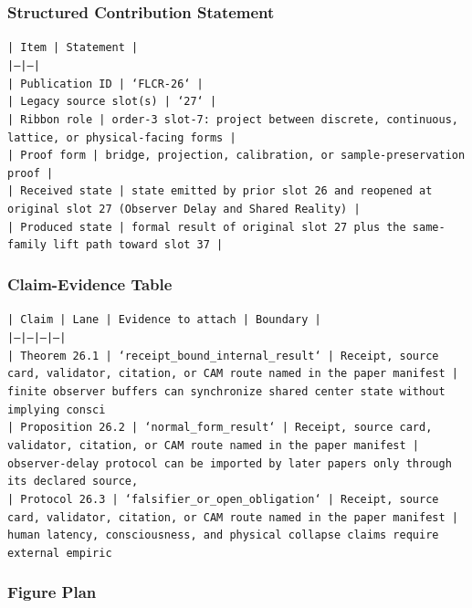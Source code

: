 \documentclass[11pt]{article}
\begin{document}
\subsubsection*{Structured Contribution Statement}

\noindent\texttt{| Item | Statement |}\\
\noindent\texttt{|---|---|}\\
\noindent\texttt{| Publication ID | `FLCR-26` |}\\
\noindent\texttt{| Legacy source slot(s) | `27` |}\\
\noindent\texttt{| Ribbon role | order-3 slot-7: project between discrete, continuous, lattice, or physical-facing forms |}\\
\noindent\texttt{| Proof form | bridge, projection, calibration, or sample-preservation proof |}\\
\noindent\texttt{| Received state | state emitted by prior slot 26 and reopened at original slot 27 (Observer Delay and Shared Reality) |}\\
\noindent\texttt{| Produced state | formal result of original slot 27 plus the same-family lift path toward slot 37 |}\\

\subsubsection*{Claim-Evidence Table}

\noindent\texttt{| Claim | Lane | Evidence to attach | Boundary |}\\
\noindent\texttt{|---|---|---|---|}\\
\noindent\texttt{| Theorem 26.1 | `receipt\_bound\_internal\_result` | Receipt, source card, validator, citation, or CAM route named in the paper manifest | finite observer buffers can synchronize shared center state without implying consci}\\
\noindent\texttt{| Proposition 26.2 | `normal\_form\_result` | Receipt, source card, validator, citation, or CAM route named in the paper manifest | observer-delay protocol can be imported by later papers only through its declared source, }\\
\noindent\texttt{| Protocol 26.3 | `falsifier\_or\_open\_obligation` | Receipt, source card, validator, citation, or CAM route named in the paper manifest | human latency, consciousness, and physical collapse claims require external empiric}\\

\subsubsection*{Figure Plan}
\end{document}
